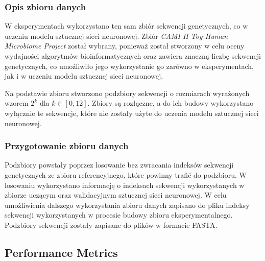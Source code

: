 \documentclass{article}
\newcommand{\temporary}[1]{
    \begin{tcolorbox}[colframe=red, colback=white, title={\textbf{WERSJA PO POLSKU}}, sharp corners=south]
        #1
    \end{tcolorbox}
}
\begin{document}
            \temporary{
                \subsubsection{Opis zbioru danych}

            W eksperymentach wykorzystano ten sam zbiór sekwencji genetycznych, co w uczeniu modelu sztucznej sieci neuronowej. Zbiór \textit{CAMI II Toy Human Microbiome Project}\cite{Fritz:2019} został wybrany, ponieważ został stworzony w celu oceny wydajności algorytmów bioinformatycznych oraz zawiera znaczną liczbę sekwencji genetycznych, co umożliwiło jego wykorzystanie go zarówno w eksperymentach, jak i w uczeniu modelu sztucznej sieci neuronowej.

            Na podstawie zbioru stworzono podzbiory sekwencji o rozmiarach wyrażonych wzorem $2^k$ dla $k \in [0, 12]$. Zbiory są rozłączne, a do ich budowy wykorzystano wyłącznie te sekwencje, które nie zostały użyte do uczenia modelu sztucznej sieci neuronowej.

        \subsubsection{Przygotowanie zbioru danych}

            Podzbiory powstały poprzez losowanie bez zwracania indeksów sekwencji genetycznych ze zbioru referencyjnego, które powinny trafić do podzbioru. W losowaniu wykorzystano informację o indeksach sekwencji wykorzystanych w zbiorze uczącym oraz walidacyjnym sztucznej sieci neuronowej. W celu umożliwienia dalszego wykorzystania zbioru danych zapisano do pliku indeksy sekwencji wykorzystanych w procesie budowy zbioru eksperymentalnego. Podzbiory sekwencji zostały zapisane do plików w formacie FASTA.
            }

        \subsection{Performance Metrics}
\end{document}
